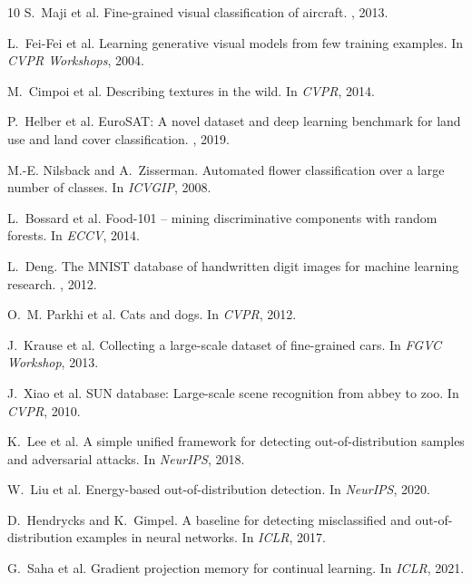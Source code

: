 \documentclass{article}
\begin{document}
\begin{thebibliography}{10}
S.~Maji et al.
\newblock Fine-grained visual classification of aircraft.
, 2013.

L.~Fei-Fei et al.
\newblock Learning generative visual models from few training examples.
\newblock In {\em CVPR Workshops}, 2004.

M.~Cimpoi et al.
\newblock Describing textures in the wild.
\newblock In {\em CVPR}, 2014.

P.~Helber et al.
\newblock EuroSAT: A novel dataset and deep learning benchmark for land use and land cover classification.
, 2019.

M.-E. Nilsback and A.~Zisserman.
\newblock Automated flower classification over a large number of classes.
\newblock In {\em ICVGIP}, 2008.

L.~Bossard et al.
\newblock Food-101 -- mining discriminative components with random forests.
\newblock In {\em ECCV}, 2014.

L.~Deng.
\newblock The MNIST database of handwritten digit images for machine learning research.
, 2012.

O.~M. Parkhi et al.
\newblock Cats and dogs.
\newblock In {\em CVPR}, 2012.

J.~Krause et al.
\newblock Collecting a large-scale dataset of fine-grained cars.
\newblock In {\em FGVC Workshop}, 2013.

J.~Xiao et al.
\newblock SUN database: Large-scale scene recognition from abbey to zoo.
\newblock In {\em CVPR}, 2010.

K.~Lee et al.
\newblock A simple unified framework for detecting out-of-distribution samples and adversarial attacks.
\newblock In {\em NeurIPS}, 2018.

W.~Liu et al.
\newblock Energy-based out-of-distribution detection.
\newblock In {\em NeurIPS}, 2020.

D.~Hendrycks and K.~Gimpel.
\newblock A baseline for detecting misclassified and out-of-distribution examples in neural networks.
\newblock In {\em ICLR}, 2017.

G.~Saha et al.
\newblock Gradient projection memory for continual learning.
\newblock In {\em ICLR}, 2021.


\end{thebibliography}
\end{document}
